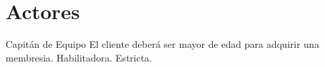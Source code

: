 \section{Actores}

\begin{Actor}{Capitán de Equipo} 
	\BRitem[Descripción:] El cliente deberá ser mayor de edad para adquirir una membresia.
	\BRitem[Tipo:] Habilitadora.
	\BRitem[Nivel:] Estricta.
\end{Actor}




